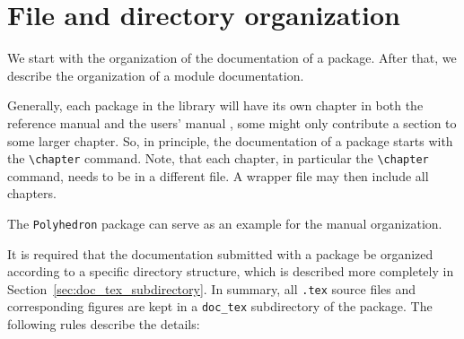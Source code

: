 \section{File and directory organization}
\label{sec:files_required}

We start with the organization of the documentation of a package.
After that, we describe the organization of a module documentation.

Generally, each package in the library will have its own chapter in
both the reference manual and the users' manual%
%
, some might only contribute a
section to some larger chapter. So, in principle, the documentation of
a package starts with the \verb|\chapter| command. Note, that each
chapter, in particular the \verb|\chapter| command, needs to be in a
different file. A wrapper file may then include all chapters.

The \texttt{Polyhedron} package can serve as an example for the manual
organization.

It is required that the documentation submitted with a package be organized
according to a specific directory structure, which is described more
completely in Section~\ref{sec:doc_tex_subdirectory}. In summary, all
{\tt .tex} source files and corresponding figures are kept in a
\texttt{doc\_tex} subdirectory of the package. The following rules
describe the details:

